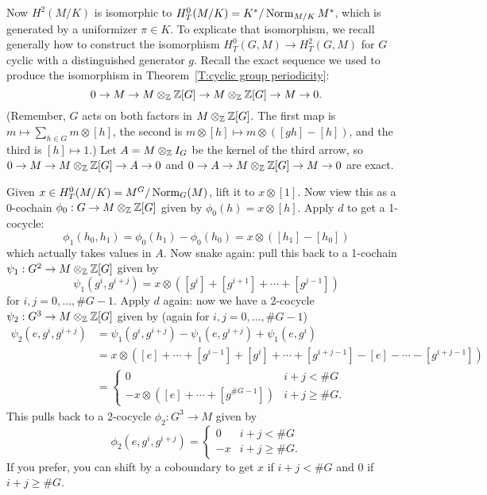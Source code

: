 Now $H^2(M/K)$ is isomorphic to $H^0_T(M/K) = K^*/\operatorname{Norm}_{M/K}M^*$, which
is generated by a uniformizer $\pi \in K$. To explicate that isomorphism,
we recall generally how to construct the isomorphism
$H^0_T(G,M) \to H^2_T(G,M)$ for $G$ cyclic with a distinguished generator $g$.
Recall the exact sequence we used to produce the isomorphism
in Theorem~\ref{T:cyclic group periodicity}:
\[
0 \to M \to M \otimes_{\mathbb{Z}} \mathbb{Z}[G] \to M \otimes_{\mathbb{Z}} \mathbb{Z}[G] \to M \to 0.
\]
(Remember, $G$ acts on both factors in $M \otimes_{\mathbb{Z}}
\mathbb{Z}[G]$. The first map is $m \mapsto \sum_{h \in G} m \otimes [h]$,
the second is $m \otimes [h] \mapsto m \otimes ([gh] - [h])$, and
the third is $[h] \mapsto 1$.)
Let $A = M \otimes_{\mathbb{Z}} I_G$ be the kernel of the third arrow, so
$0 \to M \to M \otimes_{\mathbb{Z}} \mathbb{Z}[G] \to A \to 0$
and $0 \to A \to M \otimes_{\mathbb{Z}} \mathbb{Z}[G] \to M \to 0$ are exact.

Given $x \in H^0_T(M/K) = M^G/\operatorname{Norm}_G(M)$, lift it to $x \otimes [1]$.
Now view this as a 0-cochain $\phi_0: G \to M \otimes_{\mathbb{Z}} \mathbb{Z}[G]$ given by
$\phi_0(h) = x \otimes [h]$. Apply $d$ to get a 1-cocycle:
\[
\phi_1(h_0, h_1) = \phi_0(h_1) - \phi_0(h_0) = x \otimes ([h_1]- [h_0])
\]
which actually takes values in $A$. Now snake again: pull this back to
a 1-cochain $\psi_1: G^2 \to M \otimes_{\mathbb{Z}} \mathbb{Z}[G]$ given by
\[
\psi_1(g^i, g^{i+j}) = x \otimes ([g^i] + [g^{i+1}] + \cdots + [g^{j-1}])
\]
for $i,j=0, \dots, \#G-1$.
Apply $d$ again: now we have a 2-cocycle $\psi_2: G^3 \to M \otimes_{\mathbb{Z}}
\mathbb{Z}[G]$ given by (again for $i,j=0, \dots, \#G-1$)
\begin{align*}
\psi_2(e, g^i, g^{i+j}) &= \psi_1(g^i, g^{i+j}) - \psi_1(e, g^{i+j})
+ \psi_1(e, g^i) \\
&= x \otimes ([e] + \cdots + [g^{i-1}] + [g^i] + \cdots + [g^{i+j-1}]
- [e] - \cdots - [g^{i+j-1}]) \\
&= \begin{cases} 0 & i+j < \#G \\
-x \otimes ([e] + \cdots + [g^{\#G-1}]) & i+j \geq \#G.
\end{cases}
\end{align*}
This pulls back to a 2-cocycle $\phi_2: G^3 \to M$ given by
\[
\phi_2(e, g^i, g^{i+j}) = \begin{cases} 0 & i+j < \#G \\
-x & i+j \geq \#G.
\end{cases}
\]
If you prefer, you can shift by a coboundary to get $x$ if $i+j < \#G$
and 0 if $i+j \geq \#G$.

